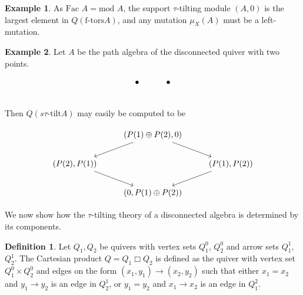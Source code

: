 \documentclass[]{article}
\theoremstyle{definition}
\newtheorem{definition}{Definition}[section]
\newtheorem{example}{Example}[section]
\newcommand{\tu}{\ensuremath{\tau}}
\newcommand{\Fac}{\ensuremath{\text{Fac }}}
\begin{document}
\begin{example}
	As $\Fac A=\text{mod } A$, the support \tu-tilting module $(A,0)$ is the largest element in $Q(\text{f-tors} A)$, and any mutation $\mu_X(A)$ must be a left-mutation.
\end{example}

\begin{example}
	Let $A$ be the path algebra of the disconnected quiver with two points.
	
	\[
	\begin{tikzcd}
	\bullet & \bullet   \\
	\end{tikzcd}
	\]
Then $Q(s\tau\text{-tilt} A)$ may easily be computed to be 

\[\begin{tikzcd}
& {(P(1)\oplus P(2),0)} \\
{(P(2),P(1))} && {(P(1),P(2))} \\
& {(0,P(1)\oplus P(2))}
\arrow[from=1-2, to=2-1]
\arrow[from=2-1, to=3-2]
\arrow[from=1-2, to=2-3]
\arrow[from=2-3, to=3-2]
\end{tikzcd}\]
\end{example}

We now show how the \tu-tilting theory of a disconnected algebra is determined by its components.

\begin{definition}
	Let $Q_1,Q_2$ be quivers with vertex sets $Q_1^0$, $Q_2^0$ and arrow sets $Q_1^1$, $Q_2^1$. The Cartesian product $Q = Q_1 \mathbin{\Box} Q_2$ is defined as the quiver with vertex set $Q_1^0 \times Q_2^0$ and edges on the form $(x_1,y_1) \to (x_2,y_2)$ such that either $x_1 = x_2$ and $y_1 \to y_2$ is an edge in $Q_2^1$, or $y_1 = y_2$ and $x_1 \to x_2$ is an edge in $Q_1^2$.
	\end{definition}
\end{document}
